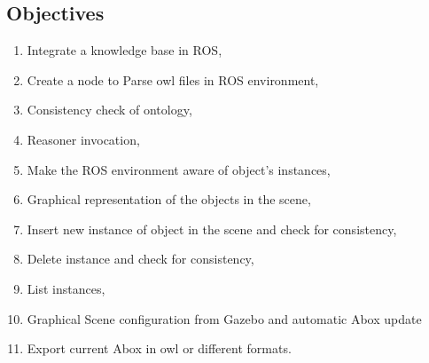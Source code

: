 \subsection{Objectives}
\begin{enumerate}
\item Integrate a knowledge base in ROS,
\item Create a node to Parse owl files in ROS environment,
\item Consistency check of ontology,
\item Reasoner invocation,
\item Make the ROS environment aware of object's instances,
\item Graphical representation of the objects in the scene,
\item Insert new instance of object in the scene and check for consistency,
\item Delete instance and check for consistency,
\item List instances,
\item Graphical Scene configuration from Gazebo and automatic Abox update
\item Export current Abox in owl or different formats.
\end{enumerate}

